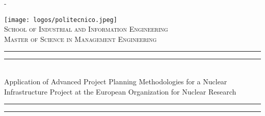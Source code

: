 %
%
% 
%
%
\begin{titlingpage}
\begin{SingleSpace}
\calccentering{\unitlength} 
\begin{adjustwidth*}{\unitlength}{-\unitlength}
\begin{center}
\texttt{[image: logos/politecnico.jpeg]}\\ \vspace{2.5mm}
\vspace*{6mm}
\textsc{\Large School of Industrial and Information Engineering}\\[0.5cm]
\textsc{\Large Master of Science in Management Engineering}\\[0.5cm]
\end{center}
\rule[0.5ex]{\linewidth}{2pt}\vspace*{-\baselineskip}\vspace*{3.2pt}
\rule[0.5ex]{\linewidth}{1pt}\\[\baselineskip]
{\huge Application of Advanced Project Planning Methodologies for a Nuclear Infrastructure Project at the European Organization for Nuclear Research }\\[4mm]
\rule[0.5ex]{\linewidth}{1pt}\vspace*{-\baselineskip}\vspace{3.2pt}
\rule[0.5ex]{\linewidth}{2pt}\\
\vspace{1.5mm}



\end{adjustwidth*}
\end{SingleSpace}
\end{titlingpage}
